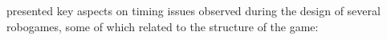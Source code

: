 
\cite{bonarini_timing_2014} presented key aspects on timing issues observed during the design of several robogames, some of which related to the structure of the game:

